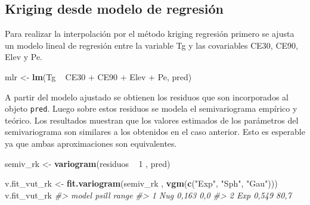 \documentclass[11pt,b5paper,]{krantz}
\newenvironment{Shaded}{}{}
\newcommand{\KeywordTok}[1]{\textcolor[rgb]{0.00,0.44,0.13}{\textbf{#1}}}
\newcommand{\DecValTok}[1]{\textcolor[rgb]{0.25,0.63,0.44}{#1}}
\newcommand{\StringTok}[1]{\textcolor[rgb]{0.25,0.44,0.63}{#1}}
\newcommand{\CommentTok}[1]{\textcolor[rgb]{0.38,0.63,0.69}{\textit{#1}}}
\newcommand{\OperatorTok}[1]{\textcolor[rgb]{0.40,0.40,0.40}{#1}}
\newcommand{\NormalTok}[1]{#1}
\begin{document}
\subsection{Kriging desde modelo de
regresión}\label{kriging-desde-modelo-de-regresiuxf3n}

Para realizar la interpolación por el método kriging regresión primero
se ajusta un modelo lineal de regresión entre la variable Tg y las
covariables CE30, CE90, Elev y Pe.

\begin{Shaded}
\begin{Highlighting}[]
\NormalTok{mlr <-}\StringTok{ }\KeywordTok{lm}\NormalTok{(Tg }\OperatorTok{~}\StringTok{ }\NormalTok{CE30 }\OperatorTok{+}\StringTok{ }\NormalTok{CE90 }\OperatorTok{+}\StringTok{ }\NormalTok{Elev }\OperatorTok{+}\StringTok{ }\NormalTok{Pe, pred)}
\end{Highlighting}
\end{Shaded}

A partir del modelo ajustado se obtienen los residuos que son
incorporados al objeto \texttt{pred}. Luego sobre estos residuos se
modela el semivariograma empírico y teórico. Los resultados muestran que
los valores estimados de los parámetros del semivariograma son similares
a los obtenidos en el caso anterior. Esto es esperable ya que ambas
aproximaciones son equivalentes.

\begin{Shaded}
\end{Shaded}

\begin{Shaded}
\begin{Highlighting}[]
\NormalTok{semiv_rk <-}\StringTok{ }\KeywordTok{variogram}\NormalTok{(residuos }\OperatorTok{~}\StringTok{ }\DecValTok{1}\NormalTok{ , pred)}

\NormalTok{v.fit_vut_rk <-}\StringTok{ }
\StringTok{  }\KeywordTok{fit.variogram}\NormalTok{(semiv_rk , }
                \KeywordTok{vgm}\NormalTok{(}\KeywordTok{c}\NormalTok{(}\StringTok{"Exp"}\NormalTok{, }\StringTok{"Sph"}\NormalTok{, }\StringTok{"Gau"}\NormalTok{)))}
\NormalTok{v.fit_vut_rk}
\CommentTok{#>   model psill range}
\CommentTok{#> 1   Nug 0,163   0,0}
\CommentTok{#> 2   Exp 0,549  80,7}
\end{Highlighting}
\end{Shaded}
\end{document}
